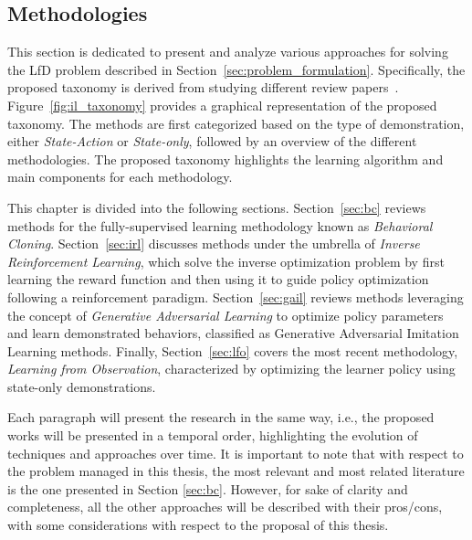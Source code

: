 \subsection{Methodologies}
\label{sec:lfd}
This section is dedicated to present and analyze various approaches for solving the LfD problem described in Section~\ref{sec:problem_formulation}. Specifically,  the proposed taxonomy is derived from studying different review papers~\cite{kaelbling1996reinforcement_survey,argall2009robot_learning_from_demonstration,hussein2017imitation_learning_survey,fang2019survey,zheng2021imitation_progress_taxonomies_opportunities,zare2024survey}. Figure~\ref{fig:il_taxonomy} provides a graphical representation of the proposed taxonomy. The methods are first categorized based on the type of demonstration, either \textit{State-Action} or \textit{State-only}, followed by an overview of the different methodologies. The proposed taxonomy highlights the learning algorithm and main components for each methodology.

This chapter is divided into the following sections. Section~\ref{sec:bc} reviews methods for the fully-supervised learning methodology known as \textit{Behavioral Cloning}. 
\newline Section~\ref{sec:irl} discusses methods under the umbrella of \textit{Inverse Reinforcement Learning}, which solve the inverse optimization problem by first learning the reward function and then using it to guide policy optimization following a reinforcement paradigm.
\newline Section~\ref{sec:gail} reviews methods leveraging the concept of \textit{Generative Adversarial Learning} to optimize policy parameters and learn demonstrated behaviors, classified as Generative Adversarial Imitation Learning methods.
\newline Finally, Section~\ref{sec:lfo} covers the most recent methodology, \textit{Learning from Observation}, characterized by optimizing the learner policy using state-only demonstrations.

Each paragraph will present the research in the same way, i.e., the proposed works will be presented in a temporal order, highlighting the evolution of techniques and approaches over time.
It is important to note that with respect to the problem managed in this thesis, the most relevant and most related literature is the one presented in Section \ref{sec:bc}. However, for sake of clarity and completeness, all the other approaches will be described with their pros/cons, with some considerations with respect to the proposal of this thesis.












